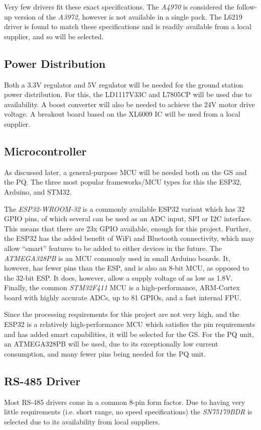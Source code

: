 Very few drivers fit these exact specifications. The \textit{A4970} is considered the follow-up version of the \textit{A3972}, however is not available in a single pack. The L6219 driver is found to match these specifications and is readily available from a local supplier, and so will be selected.

\subsection{Power Distribution}
Both a 3.3V regulator and 5V regulator will be needed for the ground station power distribution. For this, the LD1117V33C and L7805CP will be used due to availability. A boost converter will also be needed to achieve the 24V motor drive voltage. A breakout board based on the XL6009 IC will be used from a local supplier.

\subsection{Microcontroller}
As discussed later, a general-purpose MCU will be needed both on the GS and the PQ. The three most popular frameworks/MCU types for this the ESP32, Arduino, and STM32.

The \textit{ESP32-WROOM-32} is a commonly available ESP32 variant which has 32 GPIO pins, of which several can be used as an ADC input, SPI or I2C interface. This means that there are 23x GPIO available, enough for this project. Further, the ESP32 has the added benefit of WiFi and Bluetooth connectivity, which may allow “smart” features to be added to either devices in the future. The \textit{ATMEGA328PB} is an MCU commonly used in small Arduino boards. It, however, has fewer pins than the ESP, and is also an 8-bit MCU, as opposed to the 32-bit ESP. It does, however, allow a supply  voltage of as low as 1.8V. Finally, the common \textit{STM32F411} MCU is a high-performance, ARM-Cortex board with highly accurate ADCs, up to 81 GPIOs, and a fast internal FPU.

Since the processing requirements for this project are not very high, and the ESP32 is a relatively high-performance MCU which satisfies the pin requirements and has added smart capabilities, it will be selected for the GS. For the PQ unit, an ATMEGA328PB will be used, due to its exceptionally low current consumption, and many fewer pins being needed for the PQ unit.

\subsection{RS-485 Driver}
Most RS-485 drivers come in a common 8-pin form factor. Due to having very little requirements (i.e. short range, no speed specifications) the \textit{SN75179BDR} is selected due to its availability from local suppliers.